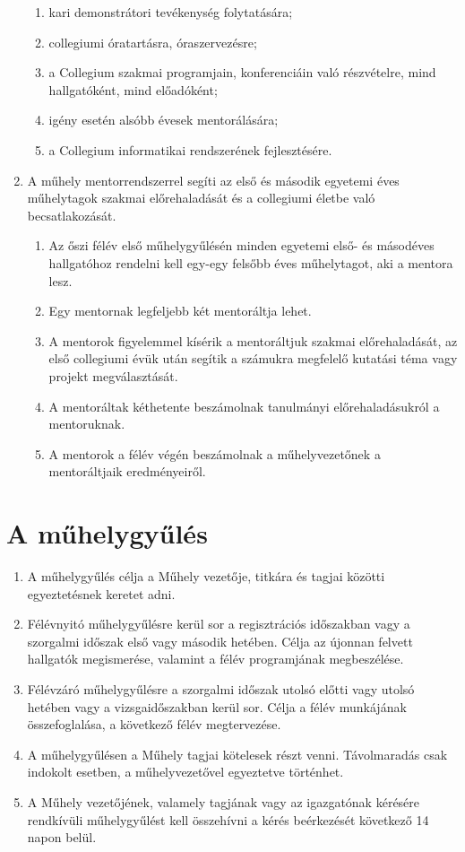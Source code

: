\documentclass{../styles/rulebook}
\begin{document}
\begin{enumerate}
\begin{enumerate}
		\item kari demonstrátori tevékenység folytatására;
		\item collegiumi óratartásra, óraszervezésre;
		\item a Collegium szakmai programjain, konferenciáin való részvételre, mind hallgatóként, mind előadóként;
		\item igény esetén alsóbb évesek mentorálására;
		\item a Collegium informatikai rendszerének fejlesztésére.
	\end{enumerate}
\item A műhely mentorrendszerrel segíti az első és második egyetemi éves műhelytagok szakmai előrehaladását és a collegiumi életbe való becsatlakozását.
	\begin{enumerate}
		\item Az őszi félév első műhelygyűlésén minden egyetemi első- és másodéves hallgatóhoz rendelni kell egy-egy felsőbb éves műhelytagot, aki a mentora lesz.
		\item Egy mentornak legfeljebb két mentoráltja lehet.
		\item A mentorok figyelemmel kísérik a mentoráltjuk szakmai előrehaladását, az első collegiumi évük után segítik a számukra megfelelő kutatási téma vagy projekt megválasztását.
		\item A mentoráltak kéthetente beszámolnak tanulmányi előrehaladásukról a mentoruknak.
		\item A mentorok a félév végén beszámolnak a műhelyvezetőnek a mentoráltjaik eredményeiről.
	\end{enumerate}
\end{enumerate}

\section{A műhelygyűlés}
\label{par:muhelygyules}

\begin{enumerate}
	\item A műhelygyűlés célja a Műhely vezetője, titkára és tagjai közötti egyeztetésnek keretet adni.
	\item Félévnyitó műhelygyűlésre kerül sor a regisztrációs időszakban vagy a szorgalmi időszak első vagy második hetében. Célja az újonnan felvett hallgatók megismerése, valamint a félév programjának megbeszélése.
	\item Félévzáró műhelygyűlésre a szorgalmi időszak utolsó előtti vagy utolsó hetében vagy a vizsgaidőszakban kerül sor. Célja a félév munkájának összefoglalása, a következő félév megtervezése.
	\item A műhelygyűlésen a Műhely tagjai kötelesek részt venni. Távolmaradás csak indokolt esetben, a műhelyvezetővel egyeztetve történhet.
	\item A Műhely vezetőjének, valamely tagjának vagy az igazgatónak kérésére rendkívüli műhelygyűlést kell összehívni a kérés beérkezését következő 14 napon belül. \label{bek:rendkivuliMuhelygyules}
\end{enumerate}
\end{document}
